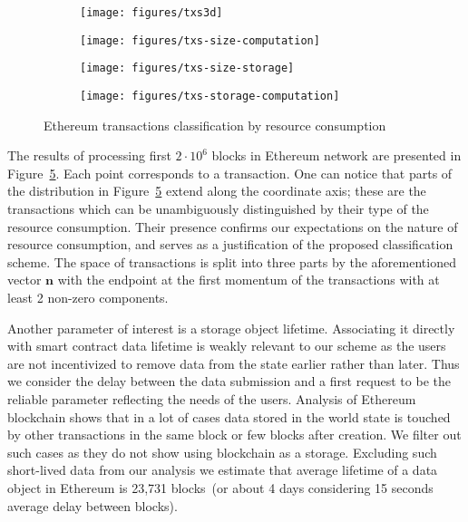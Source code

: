 \documentclass[]{llncs}   %
\begin{document}
\begin{figure}[h]
    \centering
    \begin{subfigure}[b]{0.48\textwidth}
        \texttt{[image: figures/txs3d]}
        \caption{}
        \label{fig:a}
    \end{subfigure}
    \begin{subfigure}[b]{0.48\textwidth}
        \texttt{[image: figures/txs-size-computation]}
        \caption{}
        \label{fig:b}
    \end{subfigure}

    \begin{subfigure}[b]{0.48\textwidth}
        \texttt{[image: figures/txs-size-storage]}
        \caption{}
        \label{fig:c}
    \end{subfigure}
    \begin{subfigure}[b]{0.48\textwidth}
        \texttt{[image: figures/txs-storage-computation]}
        \caption{}
        \label{fig:d}
    \end{subfigure}

    \caption{Ethereum transactions classification by resource consumption}
    \label{fig:eth}
\end{figure}

The results of processing first $2\cdot10^6$ blocks in Ethereum network are presented in Figure~\ref{fig:eth}.
Each point corresponds to a transaction.
One can notice that parts of the distribution in Figure~\ref{fig:eth} extend
along the coordinate axis; these are the transactions which can be
unambiguously distinguished by their type of the resource consumption. Their
presence confirms our expectations on the nature of resource consumption, and
serves as a justification of the proposed classification scheme. The space of
transactions is split into three parts by the aforementioned vector $\mathbf{n}$
with the endpoint at the first momentum of the transactions with at least 2
non-zero components. %

Another parameter of interest is a storage object lifetime. Associating it directly
with smart contract data lifetime is weakly relevant to our scheme as the users are not incentivized to remove data from the state earlier rather than later. Thus we consider the delay between the data submission and a first request to be the reliable parameter reflecting the needs of the users.
Analysis of Ethereum blockchain shows that in a lot of cases data stored in the world state
is touched by other transactions in the same block or few blocks after creation.
We filter out such cases as they do not show using blockchain as a storage. Excluding such short-lived data from our analysis
we estimate that average lifetime of a data object in Ethereum is 23,731 blocks~(or about 4 days
considering 15 seconds average delay between blocks).
\end{document}
